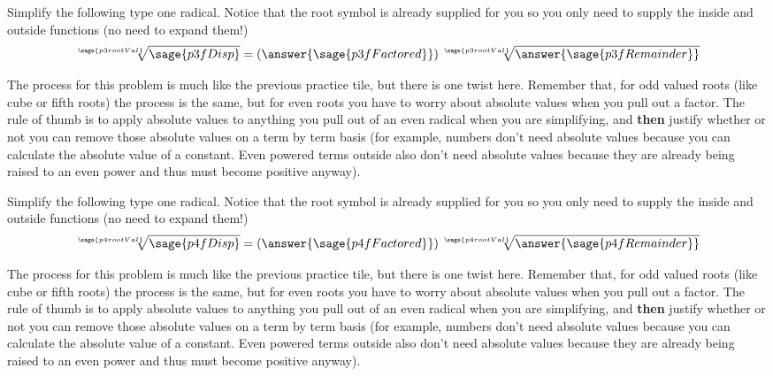 \documentclass{ximera}
\begin{document}
\begin{problem}
    Simplify the following type one radical. Notice that the root symbol is already supplied for you so you only need to supply the inside and outside functions (no need to expand them!)
    \[
        \sqrt[\sage{p3rootVal}]{\sage{p3fDisp}} = \left(\answer{\sage{p3fFactored}}\right)\sqrt[\sage{p3rootVal}]{\answer{\sage{p3fRemainder}}}
    \]
    \begin{feedback}
        The process for this problem is much like the previous practice tile, but there is one twist here. Remember that, for odd valued roots (like cube or fifth roots) the process is the same, but for even roots you have to worry about absolute values when you pull out a factor. The rule of thumb is to apply absolute values to anything you pull out of an even radical when you are simplifying, and \textbf{then} justify whether or not you can remove those absolute values on a term by term basis (for example, numbers don't need absolute values because you can calculate the absolute value of a constant. Even powered terms outside also don't need absolute values because they are already being raised to an even power and thus must become positive anyway).
    \end{feedback}
\end{problem}


\begin{problem}
    Simplify the following type one radical. Notice that the root symbol is already supplied for you so you only need to supply the inside and outside functions (no need to expand them!)
    \[
        \sqrt[\sage{p4rootVal}]{\sage{p4fDisp}} = \left(\answer{\sage{p4fFactored}}\right)\sqrt[\sage{p4rootVal}]{\answer{\sage{p4fRemainder}}}
    \]
    \begin{feedback}
        The process for this problem is much like the previous practice tile, but there is one twist here. Remember that, for odd valued roots (like cube or fifth roots) the process is the same, but for even roots you have to worry about absolute values when you pull out a factor. The rule of thumb is to apply absolute values to anything you pull out of an even radical when you are simplifying, and \textbf{then} justify whether or not you can remove those absolute values on a term by term basis (for example, numbers don't need absolute values because you can calculate the absolute value of a constant. Even powered terms outside also don't need absolute values because they are already being raised to an even power and thus must become positive anyway).
    \end{feedback}
\end{problem}
\end{document}
